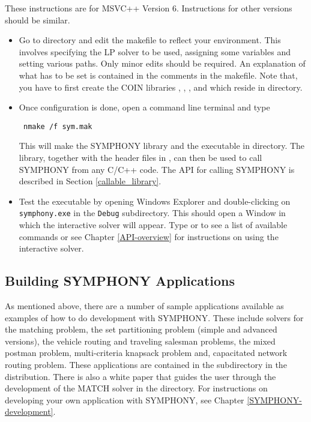 These instructions are for MSVC++ Version 6. Instructions for other versions
should be similar.

\begin{itemize}
\item Go to  directory and edit the  
makefile to reflect 
your environment. This involves specifying the LP solver to be used, 
assigning some variables and  setting various paths. Only minor edits 
should be required. An explanation of what has to be set is contained in the 
comments in the makefile.  Note that, you have to first create the COIN 
libraries , , ,  and  
which reside in  directory.

\item Once configuration is done, open a command line terminal and type 
{\color{Brown}
\begin{verbatim}
 nmake /f sym.mak
\end{verbatim}
}
This will make the SYMPHONY library  and the executable 
 in  directory. The library, together with the 
header files in , can then be used to call 
SYMPHONY from any C/C++ code. The API for calling SYMPHONY is described in 
Section \ref{callable_library}.

\item Test the executable by opening Windows Explorer and double-clicking
on {\color{Brown}\texttt{symphony.exe}} in the
{\color{Brown}\texttt{Debug\bs}} subdirectory. This should open a Window in
which the interactive solver will appear. Type  or  to see
a list of available commands or see Chapter \ref{API-overview} for
instructions on using the interactive solver.

\end{itemize}

\subsection{Building SYMPHONY Applications}
\label{build_appl_msvc}

As mentioned above, there are a number of sample applications available as
examples of how to do development with SYMPHONY. These include solvers for the
matching problem, the set partitioning problem (simple and advanced versions),
the vehicle routing and traveling salesman problems, the mixed postman
problem, multi-criteria knapsack problem and, capacitated network routing
problem. These applications are contained in the 
subdirectory in the distribution. There is also a white paper that guides the
user through the development of the MATCH solver in the 
directory. For instructions on developing your own application with SYMPHONY,
see Chapter \ref{SYMPHONY-development}.

